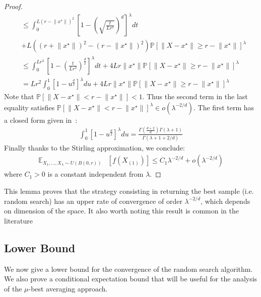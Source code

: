 \begin{proof}
\begin{align*}
&\leq \int_0^{L\left(r-\lVert x^\star\rVert\right)^2} \left[ 1-\left(\sqrt{\frac{t}{Lr^2}}\right)^d\right]^\lambda dt\\
 &+L\left(\left(r+\lVert x^\star\rVert\right)^2-\left(r-\lVert x^\star\rVert\right)^2\right) \mathbb{P}\left[ \lVert X-x^\star\rVert \geq r-\lVert x^\star\rVert\right]^\lambda \\
&\leq \int_0^{Lr^2} \left[ 1-\left(\frac{t}{Lr^2}\right)^{\frac{d}{2}}\right]^\lambda dt+4Lr\lVert x^\star\rVert\mathbb{P}\left[ \lVert X-x^\star\rVert \geq r-\lVert x^\star\rVert\right]^\lambda\\
&= Lr^2\int_0^{1} \left[ 1-u^{\frac{d}{2}}\right]^\lambda du+4Lr\lVert x^\star\rVert\mathbb{P}\left[ \lVert X-x^\star\rVert \geq r-\lVert x^\star\rVert\right]^\lambda
\end{align*}
Note that  $\mathbb{P}\left[ \lVert X-x^\star\rVert < r-\lVert x^\star\rVert\right] < 1$. Thus the second term in the last equality satisfies $\mathbb{P}\left[ \lVert X-x^\star\rVert < r-\lVert x^\star\rVert\right]^\lambda
\in o(\lambda^{-2/d})$.
The first term has a closed form given in~\cite{ppsnkbest}:
\begin{align*}
    \int_0^{1} \left[ 1-u^{\frac{d}{2}}\right]^\lambda du=\frac{\Gamma(\frac{d+2}{d})\Gamma(\lambda+1)}{\Gamma(\lambda+1+2/d)}
\end{align*}
Finally thanks to the Stirling approximation, we conclude:
\begin{align*}
\mathbb{E}_{X_1,\dots,X_\lambda\sim U(B(0,r))}&\left[ f\left(X_{(1)}\right)\right]\leq C_1 \lambda^{-2/d}+o(\lambda^{-2/d})
\end{align*}
where $C_1>0$ is a constant independent from $\lambda$.
\end{proof}
This lemma proves that the strategy consisting in returning the best sample (i.e. random search) has an upper rate of convergence of order $\lambda^{-2/d}$, which depends on dimension of the space. It also worth noting this result is common in the literature~\cite{bach,bergstra}

\subsection{Lower Bound}
We now give a lower bound for the convergence of the random search algorithm. We also prove a conditional expectation bound that will be useful for the analysis of the $\mu$-best averaging approach.


